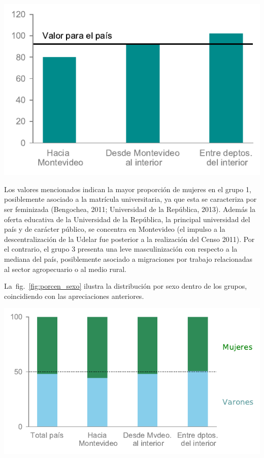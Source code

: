 \documentclass[12pt,spanish,]{article}
\let\origfigure\figure
\let\endorigfigure\endfigure
\renewenvironment{figure}[1][2] {
    \expandafter\origfigure\expandafter[H]
} {
    \endorigfigure
}
\begin{document}
\begin{figure}
\hypertarget{fig:barras_mascul}{%
\centering
\includegraphics{./tex2pdf.-8c1f0593c1a83dbe/cac7dafaea377c79e54c748ede54da28c58dbdef.pdf}
\caption{Índice de masculinidad (mujeres cada 100 hombres) para el total
de personas y para los subconjuntos de migrantes internos
recientes.}\label{fig:barras_mascul}
}
\end{figure}

Los valores mencionados indican la mayor proporción de mujeres en el
grupo 1, posiblemente asociado a la matrícula universitaria, ya que esta
se caracteriza por ser feminizada (Bengochea, 2011; Universidad de la
República, 2013). Además la oferta educativa de la Universidad de la
República, la principal universidad del país y de carácter público, se
concentra en Montevideo (el impulso a la descentralización de la Udelar
fue posterior a la realización del Censo 2011). Por el contrario, el
grupo 3 presenta una leve masculinización con respecto a la mediana del
país, posiblemente asociado a migraciones por trabajo relacionadas al
sector agropecuario o al medio rural.

La~fig.~\ref{fig:porcen_sexo} ilustra la distribución por sexo dentro de
los grupos, coincidiendo con las apreciaciones anteriores.

\begin{figure}
\hypertarget{fig:porcen_sexo}{%
\centering
\includegraphics{./tex2pdf.-8c1f0593c1a83dbe/f6bf7303e4a1f285e872a927fdce827108d9d4d7.pdf}
\caption{Distribución por sexo para el total de personas y para los
subconjuntos de migrantes internos recientes.}\label{fig:porcen_sexo}
}
\end{figure}
\end{document}
